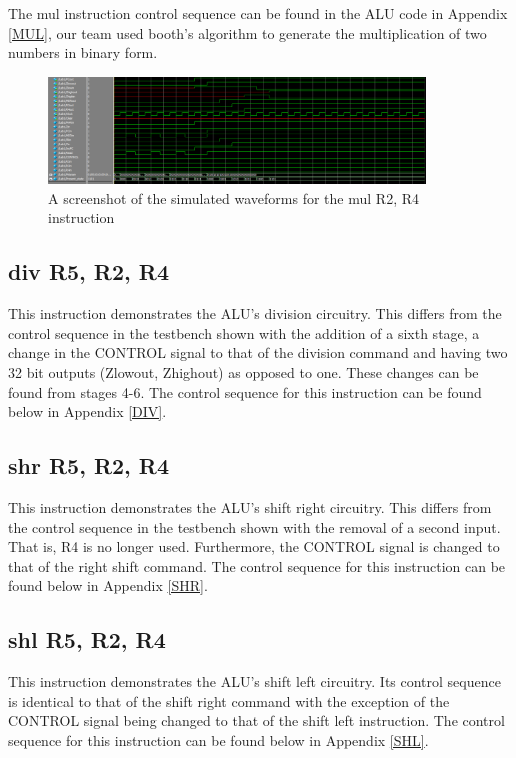 \documentclass{article}
\begin{document}
    The mul instruction control sequence can be found in the ALU code in Appendix \ref{MUL}, our team used booth's algorithm to generate the multiplication of two numbers in binary form. 
    
    \begin{figure}
        \begin{center}
            \includegraphics[width=10cm]{mul}
            \caption{A screenshot of the simulated waveforms for the mul R2, R4 instruction}
        \end{center}
    \end{figure}

    \subsection{div R5, R2, R4}
    
    This instruction demonstrates the ALU's division circuitry. This differs from the control sequence in the testbench shown with the addition of a sixth stage, a change in the CONTROL signal to that of the division command and having two 32 bit outputs (Zlowout, Zhighout) as opposed to one. These changes can be found from stages 4-6. The control sequence for this instruction can be found below in Appendix \ref{DIV}.

    \subsection{shr R5, R2, R4}
    This instruction demonstrates the ALU's shift right circuitry. This differs from the control sequence in the testbench shown with the removal of a second input. That is, R4 is no longer used. Furthermore, the CONTROL signal is changed to that of the right shift command. The control sequence for this instruction can be found below in Appendix \ref{SHR}.
    \subsection{shl R5, R2, R4}
    This instruction demonstrates the ALU's shift left circuitry. Its control sequence is identical to that of the shift right command with the exception of the CONTROL signal being changed to that of the shift left instruction. The control sequence for this instruction can be found below in Appendix \ref{SHL}.
\end{document}
